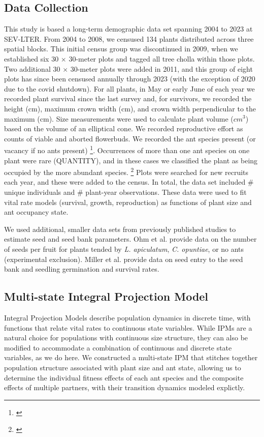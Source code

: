 \documentclass[11pt]{article}
\newcommand{\tom}[2]{{\color{red}{#1}}\footnote{\textit{\color{red}{#2}}}}
\begin{document}
\subsection*{Data Collection}
This study is based a long-term demographic data set spanning 2004 to 2023 at SEV-LTER. 
From 2004 to 2008, we censused 134 plants distributed across three spatial blocks. 
This initial census group was discontinued in 2009, when we established six 30 $\times$ 30-meter plots and tagged all tree cholla within those plots. 
Two additional 30 $\times$ 30-meter plots were added in 2011, and this group of eight plots has since been censused annually through 2023 (with the exception of 2020 due to the covid shutdown). 
For all plants, in May or early June of each year we recorded plant survival since the last survey and, for survivors, we recorded the height (cm), maximum crown width (cm), and crown width perpendicular to the maximum (cm).
Size measurements were used to calculate plant volume ($cm^3$) based on the volume of an elliptical cone. 
We recorded reproductive effort as counts of viable and aborted flowerbuds. 
We recorded the ant species present (or vacancy if no ants present) \tom{and the number of ants we could count in 30 seconds}{As long as we are not using this there is no need to report it.}.
Occurrences of more than one ant species on one plant were rare (QUANTITY), and in these cases we classified the plant as being occupied by the more abundant species. 
\tom{We also recorded the numbers and identities of herbivores on each plant.}{Again, if this is not used then do not report this here.}
Plots were searched for new recruits each year, and these were added to the census.
In total, the data set included \# unique individuals and \# plant-year observations. 
These data were used to fit vital rate models (survival, growth, reproduction) as functions of plant size and ant occupancy state. 

We used additional, smaller data sets from previously published studies to estimate seed and seed bank parameters. 
Ohm et al. \citep{Ohm2014} provide data on the number of seeds per fruit for plants tended by \textit{L. apiculatum}, \textit{C. opuntiae}, or no ants (experimental exclusion). 
Miller et al. \citep{Miller2009} provide data on seed entry to the seed bank and seedling germination and survival rates. 


\subsection*{Multi-state Integral Projection Model}
Integral Projection Models describe population dynamics in discrete time, with functions that relate vital rates to continuous state variables. 
While IPMs are a natural choice for populations with continuous size structure, they can also be modified to accommodate a combination of continuous and discrete state variables, as we do here. 
We constructed a multi-state IPM that stitches together population structure associated with plant size and ant state, allowing us to determine the individual fitness effects of each ant species and the composite effects of multiple partners, with their transition dynamics modeled explictly. 
\end{document}

